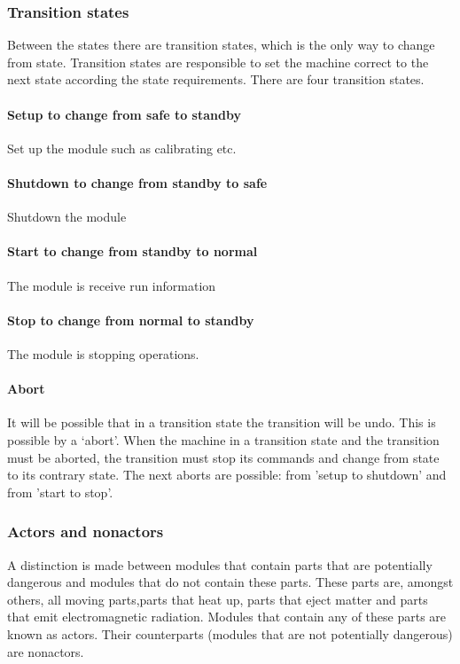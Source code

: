 \documentclass[12pt,a4paper]{report}
\begin{document}
\subsubsection{Transition states}
Between the states there are transition states, which is the only way to change from state. Transition states are responsible to set the machine correct to the next state according the state requirements.  
There are four transition states.
\paragraph{Setup to change from safe to standby}
Set up the module such as calibrating etc.
\paragraph{Shutdown to change from standby to safe}
Shutdown the module
\paragraph{Start to change from standby to normal}The module is receive run information
\paragraph{Stop to change from normal to standby}The module is stopping operations.
\paragraph{Abort}
It will be possible that in a transition state the transition will be undo. This is possible by a ‘abort’. When the machine in a transition state and the transition must be aborted, the transition must stop its commands and change from state to its contrary state. 
The next aborts are possible: from 'setup to shutdown' and from 'start to stop'. 
\subsubsection{Actors and nonactors}
A distinction is made between modules that contain parts that are potentially dangerous and modules that do not contain these parts. These parts are, amongst others, all moving parts,parts that heat up, parts that eject matter and parts that emit electromagnetic radiation. Modules that contain any of these parts are known as actors. Their counterparts (modules that are not potentially dangerous) are nonactors.\cite{mast_funcional_design}
\end{document}
